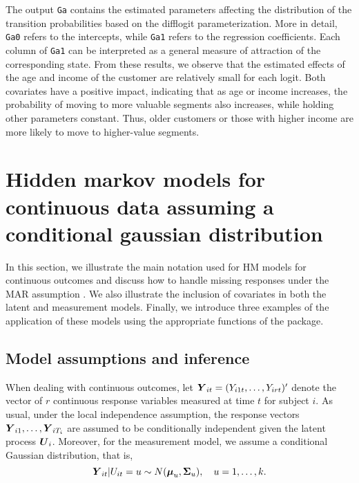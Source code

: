 The output \texttt{Ga} contains the estimated parameters affecting the
distribution of the transition probabilities based on the difflogit
parameterization. More in detail, \texttt{Ga0} refers to the intercepts, while
\texttt{Ga1} refers to the regression coefficients. Each column of \texttt{Ga1} can be
interpreted as a general measure of attraction of the corresponding
state. From these results, we observe that the estimated effects of the
age and income of the customer are relatively small for each logit. Both
covariates have a positive impact, indicating that as age or income
increases, the probability of moving to more valuable segments also
increases, while holding other parameters constant. Thus, older
customers or those with higher income are more likely to move to
higher-value segments.

\hypertarget{sec:HMcont}{%
\section{Hidden markov models for continuous data assuming a conditional gaussian distribution}\label{sec:HMcont}}

In this section, we illustrate the main notation used for HM models for
continuous outcomes and discuss how to handle missing responses under
the MAR assumption \citep{little:rub:20}. We also illustrate the
inclusion of covariates in both the latent and measurement models.
Finally, we introduce three examples of the application of these models
using the appropriate functions of the  package.

\hypertarget{sec:HMcontassump}{%
\subsection{Model assumptions and inference}\label{sec:HMcontassump}}

When dealing with continuous outcomes, let
\(\mbox{\boldmath $Y$}_{it} = (Y_{i1t}, \ldots, Y_{irt})^\prime\) denote the vector of
\(r\) continuous response variables measured at time \(t\) for subject \(i\).
As usual, under the local independence assumption, the response vectors
\(\mbox{\boldmath $Y$}_{i1}, \ldots, \mbox{\boldmath $Y$}_{iT_i}\) are assumed to be conditionally
independent given the latent process \(\mbox{\boldmath $U$}_i\). Moreover, for the
measurement model, we assume a conditional Gaussian distribution, that is,
\begin{equation}
\mbox{\boldmath $Y$}_{it}|U_{it}= u \sim N(\mbox{\boldmath $\mu$}_u,{\mbox{\boldmath $\Sigma$}}_u),\quad u=1,\ldots,k.\label{eq:norm}
\end{equation}

